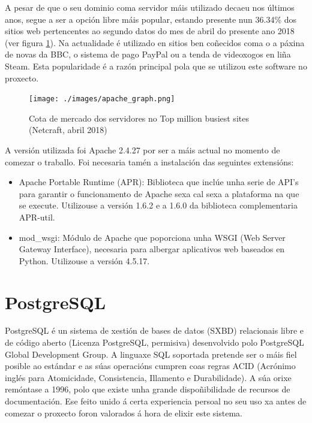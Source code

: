A pesar de que o seu dominio coma servidor máis utilizado decaeu nos últimos anos, segue a ser a opción libre máis popular, estando presente nun 36.34\% dos sitios web pertencentes ao  segundo datos do mes de abril do presente ano 2018 (ver figura \ref{fig:img_netcraft}). Na actualidade é utilizado en sitios ben coñecidos coma o a páxina de novas da BBC, o sistema de pago PayPal ou a tenda de videoxogos en liña Steam\cite{netcraft}. Esta popularidade é a razón principal pola que se utilizou este software no proxecto.

\begin{figure}[h]
	\centering
	\texttt{[image: ./images/apache\_graph.png]}
	\caption{Cota de mercado dos servidores no Top million busiest sites (Netcraft, abril 2018)}
	\label{fig:img_netcraft}
\end{figure}

A versión utilizada foi Apache 2.4.27 por ser a máis actual no momento de comezar o traballo. Foi necesaria tamén a instalación das seguintes extensións:

\begin{itemize}
	\item Apache Portable Runtime (APR): Biblioteca que inclúe unha serie de API's para garantir o funcionamento de Apache sexa cal sexa a plataforma na que se execute. Utilizouse a versión 1.6.2 e a 1.6.0 da biblioteca complementaria APR-util. 
	
	\item mod\_wsgi: Módulo de Apache que poporciona unha WSGI (Web Server Gateway Interface), necesaria para albergar aplicativos web baseados en Python. Utilizouse a versión 4.5.17.
\end{itemize}


\section{PostgreSQL}

PostgreSQL é un sistema de xestión de bases de datos (SXBD) relacionais libre e de código aberto (Licenza PostgreSQL, permisiva) desenvolvido polo PostgreSQL Global Development Group. A linguaxe SQL soportada pretende ser o máis fiel posible ao estándar e as súas operacións cumpren coas regras ACID (Acrónimo inglés para Atomicidade, Consistencia, Illamento e Durabilidade)\cite{postgres1}. A súa orixe remóntase a 1996, polo que existe unha grande dispoñibilidade de recursos de documentación. Ese feito unido á certa experiencia persoal no seu uso xa antes de comezar o proxecto foron valorados á hora de elixir este sistema.


